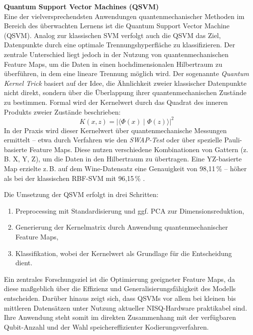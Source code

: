 \vspace{0.3cm}
\noindent
\textbf{Quantum Support Vector Machines (QSVM)}\\
\vspace{0.2cm}
Eine der vielversprechendsten Anwendungen quantenmechanischer Methoden im Bereich des überwachten Lernens ist die Quantum Support Vector Machine (QSVM). Analog zur klassischen SVM verfolgt auch die QSVM das Ziel, Datenpunkte durch eine optimale Trennungshyperfläche zu klassifizieren. Der zentrale Unterschied liegt jedoch in der Nutzung von quantenmechanischen Feature Maps, um die Daten in einen hochdimensionalen Hilbertraum zu überführen, in dem eine lineare Trennung möglich wird. \cite{kavithaQuantumMachineLearning2024} 
Der sogenannte \textit{Quantum Kernel Trick} basiert auf der Idee, die Ähnlichkeit zweier klassischer Datenpunkte nicht direkt, sondern über die Überlappung ihrer quantenmechanischen Zustände zu bestimmen. Formal wird der Kernelwert durch das Quadrat des inneren Produkts zweier Zustände beschrieben:
\[
K(x, z) = \left| \langle \Phi(x) \mid \Phi(z) \rangle \right|^2
\]
In der Praxis wird dieser Kernelwert über quantenmechanische Messungen ermittelt – etwa durch Verfahren wie den \textit{SWAP-Test} oder über spezielle Pauli-basierte Feature Maps. Diese nutzen verschiedene Kombinationen von Gattern (z.\,B. X, Y, Z), um die Daten in den Hilbertraum zu übertragen. Eine YZ-basierte Map erzielte z.\,B. auf dem Wine-Datensatz eine Genauigkeit von 98{,}11\,\% – höher als bei der klassischen RBF-SVM mit 96{,}15\,\% \cite{kavithaQuantumMachineLearning2024}.

Die Umsetzung der QSVM erfolgt in drei Schritten:  
\begin{enumerate}
  \item Preprocessing mit Standardisierung und ggf. PCA zur Dimensionsreduktion,
  \item Generierung der Kernelmatrix durch Anwendung quantenmechanischer Feature Maps,
  \item Klassifikation, wobei der Kernelwert als Grundlage für die Entscheidung dient.
\end{enumerate}  
Ein zentrales Forschungsziel ist die Optimierung geeigneter Feature Maps, da diese maßgeblich über die Effizienz und Generalisierungsfähigkeit des Modells entscheiden. Darüber hinaus zeigt sich, dass QSVMs vor allem bei kleinen bis mittleren Datensätzen unter Nutzung aktueller NISQ-Hardware praktikabel sind. Ihre Anwendung steht somit im direkten Zusammenhang mit der verfügbaren Qubit-Anzahl und der Wahl speichereffizienter Kodierungsverfahren.  

